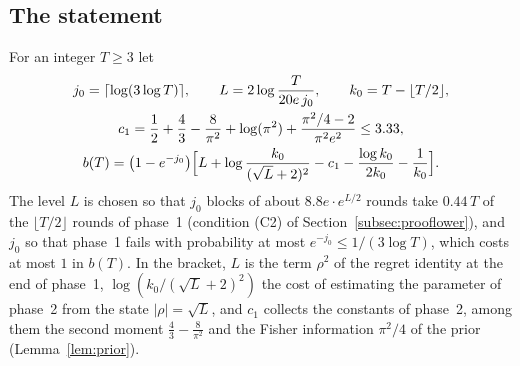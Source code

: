 \documentclass[12pt]{amsart}
\theoremstyle{definition}
\numberwithin{equation}{section}
\begin{document}
\subsection{The statement}\label{subsec:statement}
For an integer $T\ge3$ let
\begin{gather}
j_0=\lceil\log(3\log T)\rceil,\qquad L=2\log\frac{T}{20e\,j_0},\qquad k_0=T-\lfloor T/2\rfloor,\notag\\
c_1=\frac12+\frac43-\frac8{\pi^2}+\log(\pi^2)+\frac{\pi^2/4-2}{\pi^2e^2}\le3.33,\notag\\
b(T)=\bigl(1-e^{-j_0}\bigr)\Bigl[L+\log\frac{k_0}{(\sqrt L+2)^2}-c_1-\frac{\log k_0}{2k_0}-\frac1{k_0}\Bigr].\label{eq:bT}
\end{gather}
The level $L$ is chosen so that $j_0$ blocks of about $8.8e\cdot e^{L/2}$ rounds take $0.44\,T$ of the $\lfloor T/2\rfloor$ rounds of phase~1 (condition (C2) of Section~\ref{subsec:prooflower}), and $j_0$ so that phase~1 fails with probability at most $e^{-j_0}\le1/(3\log T)$, which costs at most $1$ in $b(T)$. In the bracket, $L$ is the term $\rho^2$ of the regret identity at the end of phase~1, $\log(k_0/(\sqrt L+2)^2)$ the cost of estimating the parameter of phase~2 from the state $|\rho|=\sqrt L$, and $c_1$ collects the constants of phase~2, among them the second moment $\frac43-\frac8{\pi^2}$ and the Fisher information $\pi^2/4$ of the prior (Lemma~\ref{lem:prior}).
\end{document}
